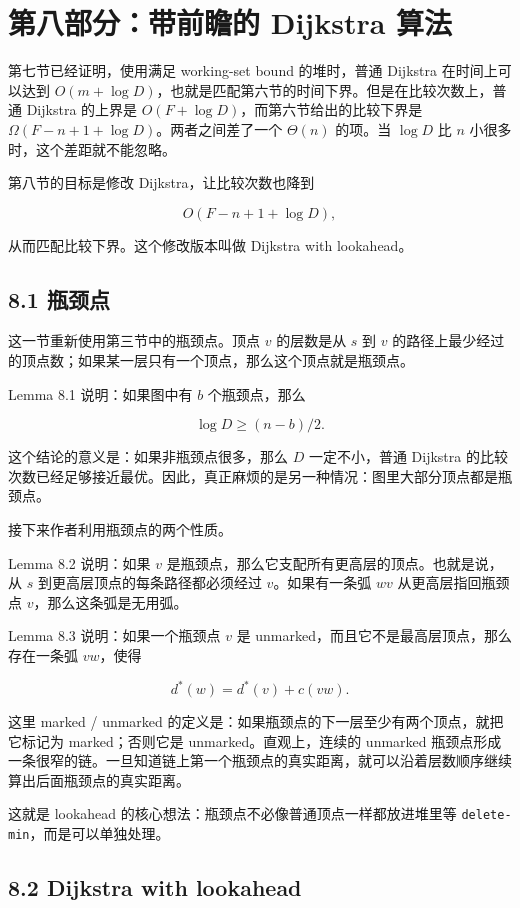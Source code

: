 \documentclass[UTF8]{ctexart}
\begin{document}
\section*{第八部分：带前瞻的 Dijkstra 算法}

第七节已经证明，使用满足 working-set bound 的堆时，普通 Dijkstra 在时间上可以达到 \(O(m+\log D)\)，也就是匹配第六节的时间下界。但是在比较次数上，普通 Dijkstra 的上界是 \(O(F+\log D)\)，而第六节给出的比较下界是 \(\Omega(F-n+1+\log D)\)。两者之间差了一个 \(\Theta(n)\) 的项。当 \(\log D\) 比 \(n\) 小很多时，这个差距就不能忽略。

第八节的目标是修改 Dijkstra，让比较次数也降到

\[
O(F-n+1+\log D),
\]

从而匹配比较下界。这个修改版本叫做 Dijkstra with lookahead。

\subsection*{8.1 瓶颈点}

这一节重新使用第三节中的瓶颈点。顶点 \(v\) 的层数是从 \(s\) 到 \(v\) 的路径上最少经过的顶点数；如果某一层只有一个顶点，那么这个顶点就是瓶颈点。

Lemma 8.1 说明：如果图中有 \(b\) 个瓶颈点，那么

\[
\log D \ge (n-b)/2.
\]

这个结论的意义是：如果非瓶颈点很多，那么 \(D\) 一定不小，普通 Dijkstra 的比较次数已经足够接近最优。因此，真正麻烦的是另一种情况：图里大部分顶点都是瓶颈点。

接下来作者利用瓶颈点的两个性质。

Lemma 8.2 说明：如果 \(v\) 是瓶颈点，那么它支配所有更高层的顶点。也就是说，从 \(s\) 到更高层顶点的每条路径都必须经过 \(v\)。如果有一条弧 \(wv\) 从更高层指回瓶颈点 \(v\)，那么这条弧是无用弧。

Lemma 8.3 说明：如果一个瓶颈点 \(v\) 是 unmarked，而且它不是最高层顶点，那么存在一条弧 \(vw\)，使得

\[
d^*(w)=d^*(v)+c(vw).
\]

这里 marked / unmarked 的定义是：如果瓶颈点的下一层至少有两个顶点，就把它标记为 marked；否则它是 unmarked。直观上，连续的 unmarked 瓶颈点形成一条很窄的链。一旦知道链上第一个瓶颈点的真实距离，就可以沿着层数顺序继续算出后面瓶颈点的真实距离。

这就是 lookahead 的核心想法：瓶颈点不必像普通顶点一样都放进堆里等 \texttt{delete-min}，而是可以单独处理。

\subsection*{8.2 Dijkstra with lookahead}
\end{document}
